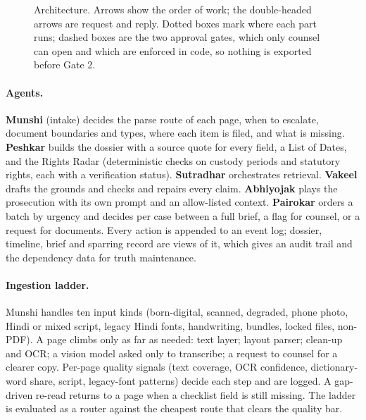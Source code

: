 \begin{figure}[!t]
\caption{Architecture. Arrows show the order of work; the double-headed arrows are request and reply. Dotted boxes mark where each part runs; dashed boxes are the two approval gates, which only counsel can open and which are enforced in code, so nothing is exported before Gate 2.}
\label{fig:arch}
\end{figure}

\paragraph{Agents.} \textbf{Munshi} (intake) decides the parse route of each page, when to escalate, document boundaries and types, where each item is filed, and what is missing. \textbf{Peshkar} builds the dossier with a source quote for every field, a List of Dates, and the Rights Radar (deterministic checks on custody periods and statutory rights, each with a verification status). \textbf{Sutradhar} orchestrates retrieval. \textbf{Vakeel} drafts the grounds and checks and repairs every claim. \textbf{Abhiyojak} plays the prosecution with its own prompt and an allow-listed context. \textbf{Pairokar} orders a batch by urgency and decides per case between a full brief, a flag for counsel, or a request for documents. Every action is appended to an event log; dossier, timeline, brief and sparring record are views of it, which gives an audit trail and the dependency data for truth maintenance.

\paragraph{Ingestion ladder.} Munshi handles ten input kinds (born-digital, scanned, degraded, phone photo, Hindi or mixed script, legacy Hindi fonts, handwriting, bundles, locked files, non-PDF). A page climbs only as far as needed: text layer; layout parser; clean-up and OCR; a vision model asked only to transcribe; a request to counsel for a clearer copy. Per-page quality signals (text coverage, OCR confidence, dictionary-word share, script, legacy-font patterns) decide each step and are logged. A gap-driven re-read returns to a page when a checklist field is still missing. The ladder is evaluated as a router against the cheapest route that clears the quality bar.

